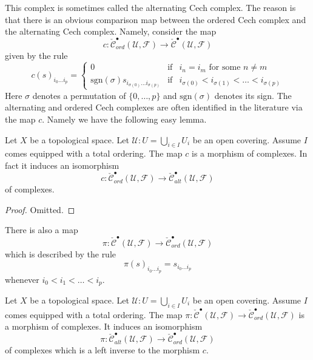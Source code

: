 \noindent
This complex is sometimes called the alternating Cech complex.
The reason is that there is an obvious comparison map between
the ordered Cech complex and the alternating Cech complex.
Namely, consider the map
$$
c :
\check{\mathcal{C}}_{ord}^\bullet(\mathcal{U}, \mathcal{F})
\longrightarrow
\check{\mathcal{C}}^\bullet(\mathcal{U}, \mathcal{F})
$$
given by the rule
$$
c(s)_{i_0\ldots i_p} = 
\left\{
\begin{matrix}
0 &
\text{if} &
i_n = i_m \text{ for some } n \not = m\\
\text{sgn}(\sigma) s_{i_{\sigma(0)}\ldots i_{\sigma(p)}} &
\text{if} &
i_{\sigma(0)} < i_{\sigma(1)} < \ldots < i_{\sigma(p)}
\end{matrix}
\right.
$$
Here $\sigma$ denotes a permutation of $\{0, \ldots, p\}$ and
$\text{sgn}(\sigma)$ denotes its sign. The alternating and ordered
Cech complexes are often identified in the literature via the map
$c$. Namely we have the following easy lemma.

\begin{lemma}
\label{lemma-ordered-alternating}
Let $X$ be a topological space.
Let $\mathcal{U} : U = \bigcup_{i \in I} U_i$ be an open covering.
Assume $I$ comes equipped with a total ordering.
The map $c$ is a morphism of complexes. In fact it induces
an isomorphism
$$
c : \check{\mathcal{C}}_{ord}^\bullet(\mathcal{U}, \mathcal{F})
\to \check{\mathcal{C}}_{alt}^\bullet(\mathcal{U}, \mathcal{F})
$$
of complexes.
\end{lemma}

\begin{proof}
Omitted.
\end{proof}

\noindent
There is also a map
$$
\pi :
\check{\mathcal{C}}^\bullet(\mathcal{U}, \mathcal{F})
\longrightarrow
\check{\mathcal{C}}_{ord}^\bullet(\mathcal{U}, \mathcal{F})
$$
which is described by the rule
$$
\pi(s)_{i_0\ldots i_p} = s_{i_0\ldots i_p}
$$
whenever $i_0 < i_1 < \ldots < i_p$.

\begin{lemma}
\label{lemma-project-to-ordered}
Let $X$ be a topological space.
Let $\mathcal{U} : U = \bigcup_{i \in I} U_i$ be an open covering.
Assume $I$ comes equipped with a total ordering.
The map $\pi : \check{\mathcal{C}}^\bullet(\mathcal{U}, \mathcal{F})
\to \check{\mathcal{C}}_{ord}^\bullet(\mathcal{U}, \mathcal{F})$
is a morphism of complexes. It induces an isomorphism
$$
\pi : \check{\mathcal{C}}_{alt}^\bullet(\mathcal{U}, \mathcal{F})
\to \check{\mathcal{C}}_{ord}^\bullet(\mathcal{U}, \mathcal{F})
$$
of complexes which is a left inverse to the morphism $c$.
\end{lemma}

